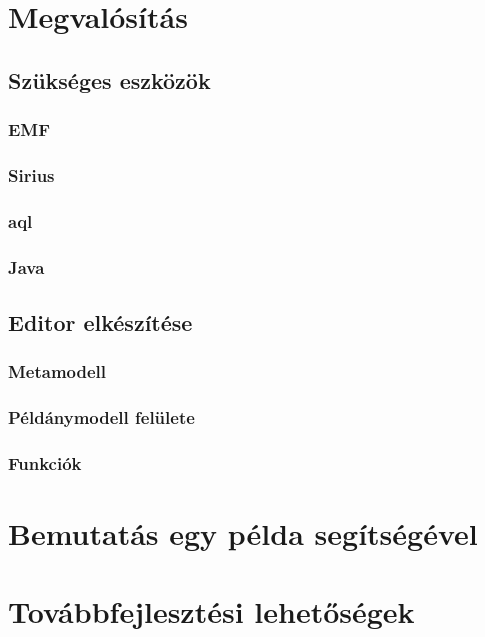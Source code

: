\documentclass[12pt]{article}
\begin{document}
	\section{Megvalósítás}
	\subsection{Szükséges eszközök}
	\subsubsection{EMF}
	\subsubsection{Sirius}
	\subsubsection{aql}
	\subsubsection{Java}
	\subsection{Editor elkészítése}
	\subsubsection{Metamodell}
	\subsubsection{Példánymodell felülete}
	\subsubsection{Funkciók}
	\section{Bemutatás egy példa segítségével}
	\section{Továbbfejlesztési lehetőségek}
	
\end{document}

